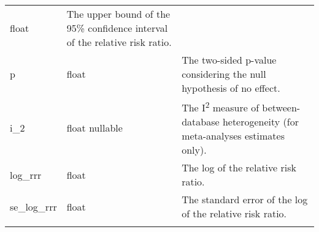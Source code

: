 \documentclass[
]{article}
\begin{document}
\begin{longtable}[]{@{}lll@{}}
\begin{minipage}[t]{0.18\columnwidth}
float\strut
\end{minipage} & \begin{minipage}[t]{0.50\columnwidth}\raggedright
The upper bound of the 95\% confidence interval of the relative risk
ratio.\strut
\end{minipage}\tabularnewline
\begin{minipage}[t]{0.23\columnwidth}\raggedright
p\strut
\end{minipage} & \begin{minipage}[t]{0.18\columnwidth}\raggedright
float\strut
\end{minipage} & \begin{minipage}[t]{0.50\columnwidth}\raggedright
The two-sided p-value considering the null hypothesis of no
effect.\strut
\end{minipage}\tabularnewline
\begin{minipage}[t]{0.23\columnwidth}\raggedright
i\_2\strut
\end{minipage} & \begin{minipage}[t]{0.18\columnwidth}\raggedright
float nullable\strut
\end{minipage} & \begin{minipage}[t]{0.50\columnwidth}\raggedright
The I\textsuperscript{2} measure of between-database heterogeneity (for
meta-analyses estimates only).\strut
\end{minipage}\tabularnewline
\begin{minipage}[t]{0.23\columnwidth}\raggedright
log\_rrr\strut
\end{minipage} & \begin{minipage}[t]{0.18\columnwidth}\raggedright
float\strut
\end{minipage} & \begin{minipage}[t]{0.50\columnwidth}\raggedright
The log of the relative risk ratio.\strut
\end{minipage}\tabularnewline
\begin{minipage}[t]{0.23\columnwidth}\raggedright
se\_log\_rrr\strut
\end{minipage} & \begin{minipage}[t]{0.18\columnwidth}\raggedright
float\strut
\end{minipage} & \begin{minipage}[t]{0.50\columnwidth}\raggedright
The standard error of the log of the relative risk ratio.\strut
\end{minipage}\tabularnewline
\begin{minipage}[t]{0.23\columnwidth}\raggedright

\end{minipage}
\end{longtable}
\end{document}
